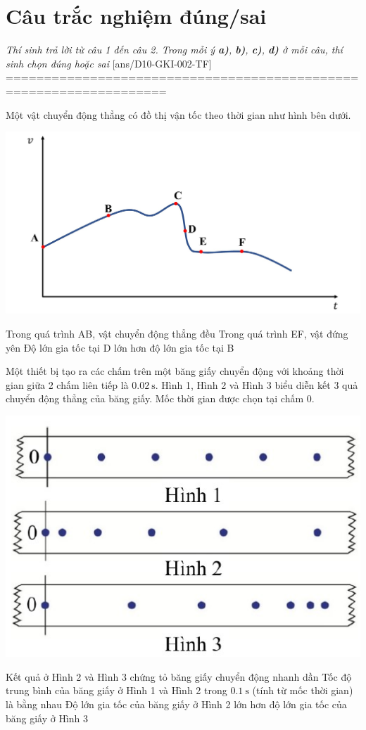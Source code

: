 \section{Câu trắc nghiệm đúng/sai} 
\textit{Thí sinh trả lời từ câu 1 đến câu 2. Trong mỗi ý \textbf{a)}, \textbf{b)}, \textbf{c)}, \textbf{d)} ở mỗi câu, thí sinh chọn đúng hoặc sai}
\setcounter{ex}{0}
[ans/D10-GKI-002-TF]
 ===================================================================
\begin{ex}
	Một vật chuyển động thẳng có đồ thị vận tốc theo thời gian như hình bên dưới.
	\begin{center}
		\includegraphics[width=0.7\linewidth]{../figs/D10-2-8}
	\end{center}
	{Trong quá trình AB, vật chuyển động thẳng đều}
	{Trong quá trình EF, vật đứng yên}
	{\True Độ lớn gia tốc tại D lớn hơn độ lớn gia tốc tại B}
	\loigiai{}
\end{ex}

\begin{ex}
	Một thiết bị tạo ra các chấm trên một băng giấy chuyển động với khoảng thời gian giữa 2 chấm liên tiếp là $\SI{0.02}{\second}$. Hình 1, Hình 2 và Hình 3 biểu diễn kết 3 quả chuyển động thẳng của băng giấy. Mốc thời gian được chọn tại chấm 0.
	\begin{center}
		\includegraphics[width=0.4\linewidth]{../figs/D10-2-9}
	\end{center}
	{Kết quả ở Hình 2 và Hình 3 chứng tỏ băng giấy chuyển động nhanh dần}
	{\True Tốc độ trung bình của băng giấy ở Hình 1 và Hình 2 trong $\SI{0.1}{\second}$ (tính từ mốc thời gian) là bằng nhau}
	{Độ lớn gia tốc của băng giấy ở Hình 2 lớn hơn độ lớn gia tốc của băng giấy ở Hình 3}
\end{ex}

